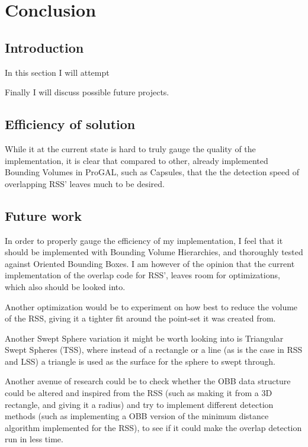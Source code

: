 
\section{Conclusion}
\label{conclusion}
\subsection{Introduction}
In this section I will attempt 

Finally I will discuss possible future projects.

\subsection{Efficiency of solution}
While it at the current state is hard to truly gauge the quality of the implementation, it is clear that compared to other, already implemented Bounding Volumes in ProGAL, such as Capsules, that the the detection speed of overlapping RSS' leaves much to be desired.

\subsection{Future work}
In order to properly gauge the efficiency of my implementation, I feel that it should be implemented with Bounding Volume Hierarchies, and thoroughly tested against Oriented Bounding Boxes. I am however of the opinion that the current implementation of the overlap code for RSS', leaves room for optimizations, which also should be looked into. 

Another optimization would be to experiment on how best to reduce the volume of the RSS, giving it a tighter fit around the point-set it was created from.

Another Swept Sphere variation it might be worth looking into is Triangular Swept Spheres (TSS), where instead of a rectangle or a line (as is the case in RSS and LSS) a triangle is used as the surface for the sphere to swept through. 

Another avenue of research could be to check whether the OBB data structure could be altered and inspired from the RSS (such as making it from a 3D rectangle, and giving it a radius) and try to implement different detection methods (such as implementing a OBB version of the minimum distance algorithm implemented for the RSS), to see if it could make the overlap detection run in less time.
